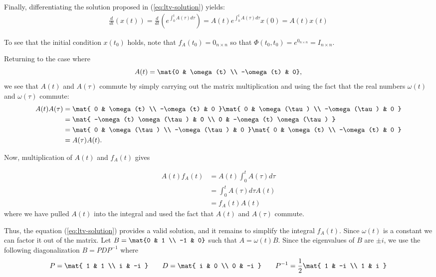 \documentclass{homework}
\begin{document}
Finally, differentiating the solution proposed in (\ref{eq:ltv-solution}) yields:
\begin{align*}
    \frac{d}{dt}(x(t)) = \frac{d}{dt}(e^{\int_{0}^{t} A(\tau) d\tau})
        = A(t) e^{\int_{0}^{t} A(\tau)d\tau} x(0)
        = A(t) x(t)
\end{align*}

To see that the initial condition $x(t_0)$ holds, note that
$f_A(t_0) = 0_{n \times n}$ so that
$\Phi(t_0, t_0) = e^{0_{n\times n}} = I_{n\times n}$.

Returning to the case where
\begin{equation*}
    A(t) = \mat{0 & \omega(t) \\ -\omega(t) & 0},
\end{equation*}
we see that $A(t)$ and $A(\tau)$ commute by simply carrying out the matrix
multiplication and using the fact that the real numbers $\omega(t)$ and
$\omega(\tau)$ commute:
\begin{align*}
    A(t) A(\tau) &= \mat{
        0 & \omega(t) \\
        -\omega(t) & 0
    } \mat{
        0 & \omega(\tau) \\
        -\omega(\tau) & 0
    } \\
    &= \mat{
        -\omega(t) \omega(\tau) & 0 \\
        0 & -\omega(t) \omega(\tau)
    } \\
    &= \mat{
        0 & \omega(\tau) \\
        -\omega(\tau) & 0
    } \mat{
        0 & \omega(t) \\
        -\omega(t) & 0
    } \\
    &= A(\tau) A(t).
\end{align*}

Now, multiplication of $A(t)$ and $f_A(t)$ gives

\begin{align*}
    A(t) f_A(t) &= A(t) \int_{0}^{t} A(\tau) d\tau \\
        &= \int_{0}^{t} A(\tau) d\tau A(t) \\
        &= f_A(t) A(t)
\end{align*}
where we have pulled $A(t)$ into the integral and used the fact that
$A(t)$ and $A(\tau)$ commute.

Thus, the equation (\ref{eq:ltv-solution}) provides a valid solution, and
it remains to simplify the integral $f_A(t)$. Since $\omega(t)$ is a constant
we can factor it out of the matrix. Let $B = \mat{0 & 1 \\ -1 & 0}$ such
that $A = \omega(t)B$. Since the eigenvalues of $B$ are $\pm i$, we use
the following diagonalization $B = PDP^{-1}$ where
\begin{equation*}
    P = \mat{
        1 & 1 \\
        i & -i
    } \qquad D = \mat{
        i & 0 \\
        0 & -i
    } \qquad P^{-1} = \frac{1}{2} \mat{
        1 & -i \\
        1 & i
    }
\end{equation*}
\end{document}
